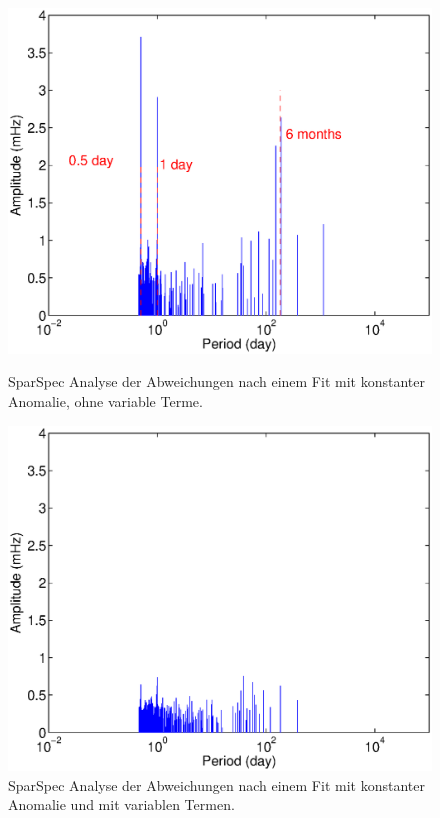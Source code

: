 \begin{figure}[htnb]
\begin{minipage}[t]{\linewidth}
	\centering
	\includegraphics[width=.8\linewidth]{images/SparSpec_begining}
  \caption{SparSpec Analyse der Abweichungen nach einem Fit mit konstanter Anomalie, ohne variable Terme.\cite{Levy2009}}\label{fig:SparSpec_pre}
\end{minipage}
\hfill
\begin{minipage}[t]{\linewidth}
	\centering
	\includegraphics[width=.8\linewidth]{images/SparSpec_end}
  \caption{SparSpec Analyse der Abweichungen nach einem Fit mit konstanter Anomalie und mit variablen Termen.\cite{Levy2009}}\label{fig:SparSpec_post}
\end{minipage}
 \end{figure}

